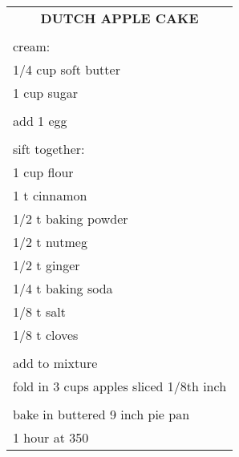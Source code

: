 \documentclass[8pt]{report}
\begin{document}
\newpage

\centering

\begin{tabular}{|l|} \hline	%
 
\multicolumn{1}{|c|}{\textbf{DUTCH APPLE CAKE}}
\\
\\

\index{desserts!dutch apple cake} \index{dutch apple cake}
\index{apple!dutch apple cake}

cream:\\
\hspace{0.5 in}	1/4 cup soft butter\\
\hspace{0.5 in}	1 cup sugar\\
\\
add 1 egg\\
\\
sift together:\\
\hspace{0.5 in}	1 cup flour\\
\hspace{0.5 in}	1 t cinnamon\\
\hspace{0.5 in}	1/2 t baking powder\\
\hspace{0.5 in}	1/2 t nutmeg\\
\hspace{0.5 in}	1/2 t ginger\\
\hspace{0.5 in}	1/4 t baking soda\\
\hspace{0.5 in}	1/8 t salt\\
\hspace{0.5 in}	1/8 t cloves\\
\\
add to mixture\\
fold in 3 cups apples sliced 1/8th inch\\
\\
bake in buttered 9 inch pie pan\\
1 hour at 350\\

\hline

\end{tabular}
\end{document}
